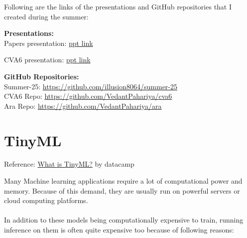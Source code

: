 \documentclass[12pt, a4paper]{article}
\begin{document}
Following are the links of the presentations and GitHub repositories that I created during the summer:

\vspace{0.5em}
\textbf{Presentations:} \\
Papers presentation: \href{https://docs.google.com/presentation/d/1tAGKJU-TlRngqz8VNp90NUBSwesvy3J64TVTdOdkFnE/edit?slide=id.p#slide=id.p}{ppt link}

CVA6 presentation: \href{https://docs.google.com/presentation/d/1vgrk5sHTAKNV6zUNwxegrh-B53roj8c8m9Zbg49O3Hg/edit?usp=sharing}{ppt link}

\vspace{0.5em}

\textbf{GitHub Repositories:} \\
Summer-25: \url{https://github.com/illusion8064/summer-25}\\
CVA6 Repo: \url{https://github.com/VedantPahariya/cva6}\\
Ara Repo: \url{https://github.com/VedantPahariya/ara}

\section{TinyML}
Reference: \href{https://www.datacamp.com/blog/what-is-tinyml-tiny-machine-learning}{What is TinyML?}  by datacamp

Many Machine learning applications require a lot of computational power and memory. Because of this demand, they are usually run on powerful servers or cloud computing platforms. 
\vspace{1em} \\
 \\

In addition to these models being computationally expensive to train, running inference on them is often quite expensive too because of following reasons:
\end{document}
